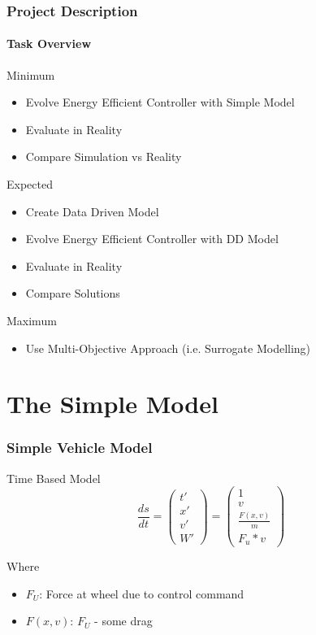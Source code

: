 \documentclass[8pt]{beamer}
\begin{document}
\begin{frame}
	\frametitle{Project Description}
	\framesubtitle{Task Overview}
	\pause
	\begin{block}{Minimum}
	\pause
	\begin{itemize}[<+->]
		\item Evolve Energy Efficient Controller with Simple Model
		\item Evaluate in Reality 
		\item Compare Simulation vs Reality
	\end{itemize}
	\end{block}	
	\pause
	
	\begin{block}{Expected}
	\pause
	\begin{itemize}[<+->]
		\item Create Data Driven Model 
		\item Evolve Energy Efficient Controller with DD Model
		\item Evaluate in Reality
		\item Compare Solutions		
	\end{itemize}
	\end{block}	
	\pause
	
	\begin{block}{Maximum}
	\pause
	\begin{itemize}[<+->]
		\item Use Multi-Objective Approach (i.e. Surrogate Modelling)
	\end{itemize}
	\end{block}
	
\end{frame}

\section{The Simple Model}
\begin{frame}
	\frametitle{Simple Vehicle Model}
	\begin{block}{Time Based Model}	
	\[
	\frac{ds}{dt} = \left(
			\begin{array}{ll}
			t' \\
			x' \\
			v' \\
			W'
			\end{array}
		\right)
		= \left(
			\begin{array}{ll}
			1 \\
			v \\
			\frac{F(x,v)}{m} \\
			F_u * v
			\end{array}
		\right)
	\]
	
	Where\\
	\begin{itemize}
		\item $F_U$: Force at wheel due to control command
		\item $F(x,v)$: $F_U$ - some drag
	\end{itemize}
	\end{block}

\end{frame}
\end{document}
